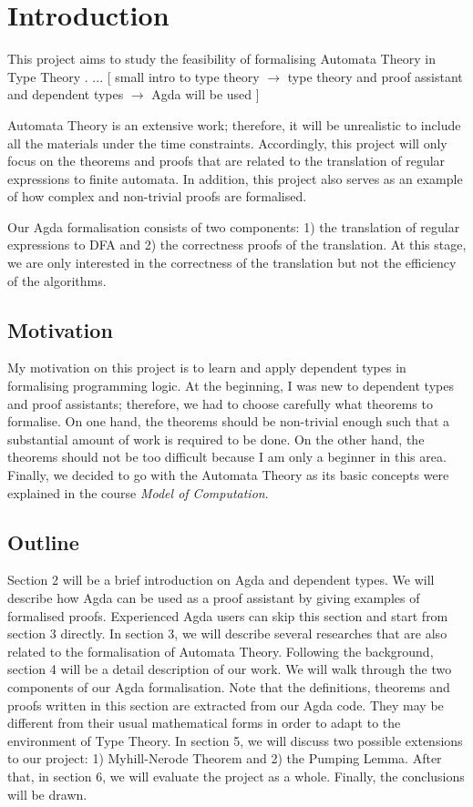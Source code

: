 \section{Introduction}
\par This project aims to study the feasibility of formalising
Automata Theory \cite{aho1972} in Type Theory \cite{martin1984}. 
... [ small intro to type theory \(\to\) type theory and proof assistant and
dependent types \(\to\) Agda will be used ] 

\par Automata Theory is an extensive work; therefore, it will be unrealistic to
include all the materials under the time constraints. Accordingly,
this project will only focus on the theorems and
proofs that are related to the translation of regular expressions
to finite automata. In addition, this project also serves as an
example of how complex and non-trivial proofs are formalised. 

\par Our Agda formalisation consists of two components: 1) the
translation of regular expressions to DFA and 2)
the correctness proofs of the translation. At this stage, we are only
interested in the correctness of the translation but not the
efficiency of the algorithms. 


\subsection{Motivation}
\par My motivation on this project is to learn and apply
dependent types in formalising programming logic. At the beginning, I
was new to dependent types and proof assistants; therefore, we
had to choose carefully what theorems to formalise. On one hand, the theorems
should be non-trivial enough such that a substantial amount of work is required
to be done. On the other hand, the theorems should not be too
difficult because I am only a beginner in this area. Finally, we
decided to go with the Automata Theory as its basic concepts were
explained in the course \textit{Model of Computation}. 


\subsection{Outline}
\par Section 2 will be a brief introduction on Agda and
dependent types. We will describe how Agda can be used as a proof
assistant by giving examples of formalised proofs. Experienced Agda
users can skip this section and start from section 3 directly. In
section 3, we will describe several researches
that are also related to the formalisation of Automata
Theory. Following the background, section 4 will be a detail description of our
work. We will walk through the two components of our Agda
formalisation. Note that the definitions,
theorems and proofs written in this section are extracted from our
Agda code. They may be different from
their usual mathematical forms in order to adapt to the environment of
Type Theory. In section 5, we will discuss two possible extensions
to our project: 1) Myhill-Nerode Theorem and 2) the Pumping
Lemma. After that, in section 6, we will evaluate the project as a
whole. Finally, the conclusions will be drawn. 
